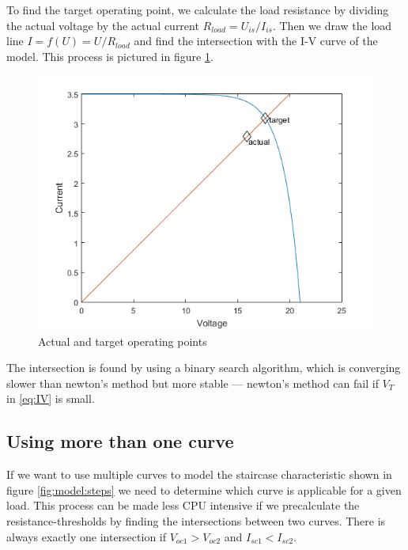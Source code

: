 To find the target operating point, we calculate the load resistance by dividing
the actual voltage by the actual current $R_{load} = U_{is}  /  I_{is}$. Then we
draw the load line $I = f(U) =  U / R_{load}$ and find the intersection with the
I-V   curve   of   the   model.   This   process   is   pictured    in    figure
\ref{fig:model:approx}.
\begin{figure}[h]
	\center
    \includegraphics[width=.75\textwidth]{images/model/approx.png}
    \caption{Actual and target operating points}
    \label{fig:model:approx}
\end{figure}
The  intersection  is found  by  using  a  binary  search  algorithm,  which  is
converging slower than newton's method but more  stable  --- newton's method can
fail if $V_T$ in \eqref{eq:IV} is small.


\subsection{Using more than one curve}

If we want to use multiple curves to model the staircase characteristic shown in
figure \ref{fig:model:steps} we  need to determine which curve is applicable for
a given load. This process can be made less CPU intensive if we precalculate the
resistance-thresholds by finding the intersections between two curves.  There is
always exactly one intersection if  $V_{oc1} > V_{oc2}$ and $I_{sc1} < I_{sc2}$.

